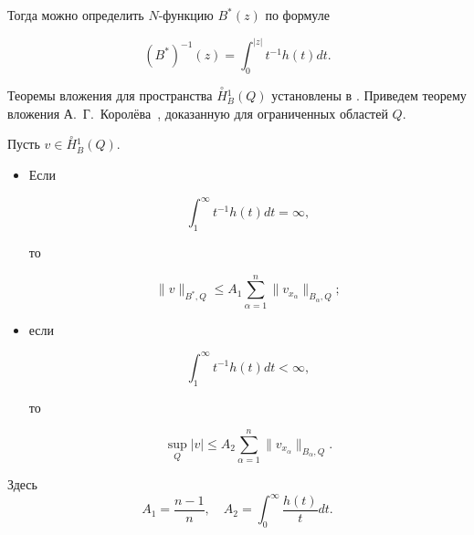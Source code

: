 Тогда можно определить $N$-функцию $B^{*}(z)$ по формуле

$$

(B^{*})^{-1}(z)=\int_0^{|z|} {t}^{-1}{h(t)}dt.

$$

Теоремы вложения для пространства $\stackrel {\circ}

{H}\!_{B}^1(Q)$ установлены в \cite{KozhKhad:bib:Klimov3, KozhKhad:bib:Korolev1}. Приведем теорему вложения  А.~Г.~Королёва~\cite{KozhKhad:bib:Korolev1}, доказанную для ограниченных областей $Q$.



\smallskip



\hypertarget{kozh:lemma2}{}



\begin{lemma}[2]Пусть $v\in \stackrel {\circ} {H}\!_{B}^1(Q).$

\begin{itemize}



\item[\rm 1)] Если

\begin{equation}\label{eq:Kozh:1}

\int_1^{\infty}t^{-1}{h(t)}dt=\infty,

\end{equation}

то

\begin{equation}\label{eq:Kozh:K1}

\|v\|_{B^*,Q}\leq A_1\sum_{\alpha=1}^n\|v_{x_{\alpha}}\|_{B_{\alpha},Q};

\end{equation}

\item[\rm 2)] если

\begin{equation}\label{eq:Kozh:2}

\int_1^{\infty}t^{-1}{h(t)}dt<\infty,

\end{equation}

то

\begin{equation}\label{eq:Kozh:K2}

\sup_{Q}|v|\leq A_2\sum_{\alpha=1}^n\|v_{x_{\alpha}}\|_{B_{\alpha},Q}.

\end{equation}



\end{itemize}

Здесь $$A_1=\frac{n-1}{n},\quad A_2=\int_0^\infty\frac{h(t)}{t}dt.$$

\end{lemma}





